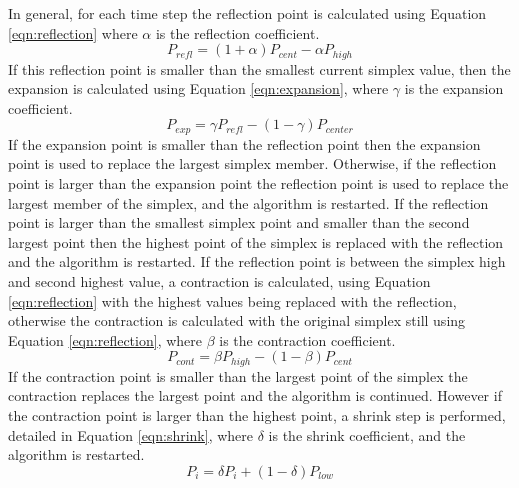 In general, for each time step the reflection point is calculated using Equation \ref{eqn:reflection} where $\alpha$ is the reflection coefficient.
	\begin{equation}\label{eqn:reflection}
		P_{refl} = (1 + \alpha) P_{cent} - \alpha P_{high}
	\end{equation}
If this reflection point is smaller than the smallest current simplex value, then the expansion is calculated using Equation \ref{eqn:expansion}, where $\gamma$ is the expansion coefficient.
	\begin{equation}\label{eqn:expansion}
		P_{exp} = \gamma P_{refl} - (1 - \gamma) P_{center}
	\end{equation}
If the expansion point is smaller than the reflection point then the expansion point is used to replace the largest simplex member.  Otherwise, if the reflection point is larger than the expansion point the reflection point is used to replace the largest member of the simplex, and the algorithm is restarted.
If the reflection point is larger than the smallest simplex point and smaller than the second largest point then the highest point of the simplex is replaced with the reflection and the algorithm is restarted. 
If the reflection point is between the simplex high and second highest value, a contraction is calculated, using Equation \ref{eqn:reflection} with the highest values being replaced with the reflection, otherwise the contraction is calculated with the original simplex still using Equation \ref{eqn:reflection}, where $\beta$ is the contraction coefficient.
	\begin{equation}\label{eqn:contraction}
		P_{cont} = \beta P_{high} - (1 - \beta) P_{cent}	
	\end{equation}
If the contraction point is smaller than the largest point of the simplex the contraction replaces the largest point and the algorithm is continued.
However if the contraction point is larger than the highest point, a shrink step is performed, detailed in Equation \ref{eqn:shrink}, where $\delta$ is the shrink coefficient, and the algorithm is restarted.
	\begin{equation}\label{eqn:shrink}
		P_{i} = \delta P_{i} + (1 - \delta) P_{low}
	\end{equation}